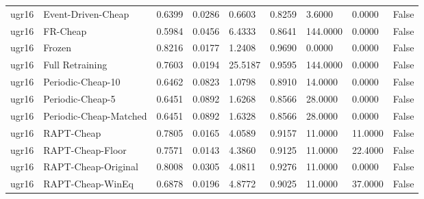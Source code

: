 \begin{table}[t]
\begin{tabular}{lllllllll}
ugr16 & Event-Driven-Cheap & 0.6399 & 0.0286 & 0.6603 & 0.8259 & 3.6000 & 0.0000 & False \\
ugr16 & FR-Cheap & 0.5984 & 0.0456 & 6.4333 & 0.8641 & 144.0000 & 0.0000 & False \\
ugr16 & Frozen & 0.8216 & 0.0177 & 1.2408 & 0.9690 & 0.0000 & 0.0000 & False \\
ugr16 & Full Retraining & 0.7603 & 0.0194 & 25.5187 & 0.9595 & 144.0000 & 0.0000 & False \\
ugr16 & Periodic-Cheap-10 & 0.6462 & 0.0823 & 1.0798 & 0.8910 & 14.0000 & 0.0000 & False \\
ugr16 & Periodic-Cheap-5 & 0.6451 & 0.0892 & 1.6268 & 0.8566 & 28.0000 & 0.0000 & False \\
ugr16 & Periodic-Cheap-Matched & 0.6451 & 0.0892 & 1.6328 & 0.8566 & 28.0000 & 0.0000 & False \\
ugr16 & RAPT-Cheap & 0.7805 & 0.0165 & 4.0589 & 0.9157 & 11.0000 & 11.0000 & False \\
ugr16 & RAPT-Cheap-Floor & 0.7571 & 0.0143 & 4.3860 & 0.9125 & 11.0000 & 22.4000 & False \\
ugr16 & RAPT-Cheap-Original & 0.8008 & 0.0305 & 4.0811 & 0.9276 & 11.0000 & 0.0000 & False \\
ugr16 & RAPT-Cheap-WinEq & 0.6878 & 0.0196 & 4.8772 & 0.9025 & 11.0000 & 37.0000 & False \\
\bottomrule
\end{tabular}
\end{table}
